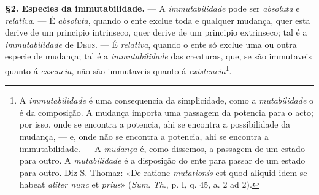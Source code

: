 \textbf{§2. Especies da immutabilidade.} --- A \emph{immutabilidade} pode ser \emph{absoluta} e \emph{relativa}. --- É \emph{absoluta}, quando o ente exclue toda e qualquer mudança, quer esta derive de um principio intrinseco, quer derive de um principio extrinseco; tal é a \emph{immutabilidade} de \textsc{Deus}. --- É \emph{relativa}, quando o ente só exclue uma ou outra especie de mudança; tal é a \emph{immutabilidade} das creaturas, que, se são immutaveis quanto á \emph{essencia}, não são immutaveis quanto á \emph{existencia}\footnote{A \emph{immutabilidade} é uma consequencia da simplicidade, como a \emph{mutabilidade} o é da composição. A mudança importa uma passagem da potencia para o acto; por isso, onde se encontra a potencia, ahi se encontra a possibilidade da mudança, --- e, onde não se encontra a potencia, ahi se encontra a immutabilidade. --- A \emph{mudança} é, como dissemos, a passagem de um estado para outro. A \emph{mutabilidade} é a disposição do ente para passar de um estado para outro. Diz S. Thomaz: «De ratione \emph{mutationis} est quod aliquid idem se habeat \emph{aliter nunc} et \emph{prius}» (\emph{Sum}. \emph{Th}., p. I, q. 45, a. 2 ad 2).}.


